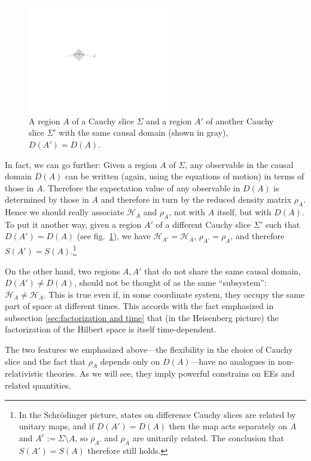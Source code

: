 \documentclass[11pt]{article}
\newcommand{\HH}{\mathcal{H}}
\begin{document}
\begin{figure}[tbp]
\centering
\includegraphics[width=0.55\textwidth]{figs/causaldomain.pdf}
\caption{\label{fig:causaldomain}
A region $A$ of a Cauchy slice $\Sigma$ and a region $A'$ of another Cauchy slice $\Sigma'$ with the same causal domain (shown in gray), $D(A')=D(A)$.
}
\end{figure}

In fact, we can go further: Given a region $A$ of $\Sigma$, any observable in the causal domain $D(A)$ can be written (again, using the equations of motion) in terms of those in $A$. Therefore the expectation value of any observable in $D(A)$ is determined by those in $A$ and therefore in turn by the reduced density matrix $\rho_A$. Hence we should really associate $\HH_A$ and $\rho_A$, not with $A$ itself, but with $D(A)$. To put it another way, given a region $A'$ of a different Cauchy slice $\Sigma'$ such that $D(A')=D(A)$ (see fig.\ \ref{fig:causaldomain}), we have $\HH_{A'}=\HH_A$, $\rho_{A'} = \rho_A$, and therefore $S(A')=S(A)$.\footnote{In the Schr\"odinger picture, states on difference Cauchy slices are related by unitary maps, and if $D(A')=D(A)$ then the map acts separately on $A$ and $A^c:=\Sigma\setminus A$, so $\rho_{A'}$ and $\rho_A$ are unitarily related. The conclusion that $S(A')=S(A)$ therefore still holds.}

On the other hand, two regions $A,A'$ that do not share the same causal domain, $D(A')\neq D(A)$, should not be thought of as the same ``subsystem'': $\HH_{A
}\neq\HH_{A}$. This is true even if, in some coordinate system, they occupy the same part of space at different times. This accords with the fact emphasized in subsection \ref{sec:factorization and time} that (in the Heisenberg picture) the factorization of the Hilbert space is itself time-dependent.

The two features we emphasized above---the flexibility in the choice of Cauchy slice and the fact that $\rho_A$ depends only on $D(A)$---have no analogues in non-relativistic theories. As we will see, they imply powerful constrains on EEs and related quantities.
\end{document}

